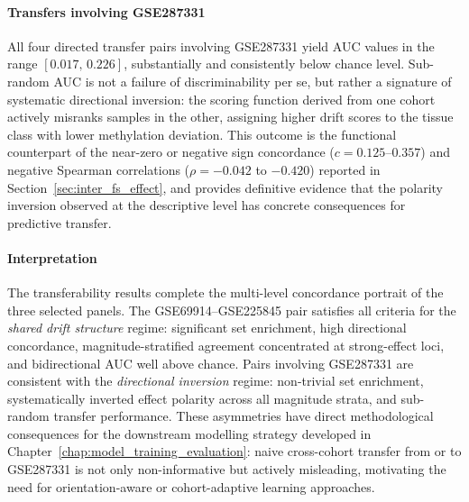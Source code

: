 \paragraph{Transfers involving GSE287331}
All four directed transfer pairs involving GSE287331 yield AUC values
in the range $[0.017,\, 0.226]$, substantially and consistently below
chance level.
Sub-random AUC is not a failure of discriminability per se, but rather
a signature of systematic directional inversion: the scoring function
derived from one cohort actively misranks samples in the other,
assigning higher drift scores to the tissue class with lower methylation
deviation.
This outcome is the functional counterpart of the near-zero or negative
sign concordance ($c = 0.125$--$0.357$) and negative Spearman correlations
($\rho = -0.042$ to $-0.420$) reported in Section~\ref{sec:inter_fs_effect},
and provides definitive evidence that the polarity inversion observed at
the descriptive level has concrete consequences for predictive transfer.

\paragraph{Interpretation}
The transferability results complete the multi-level concordance portrait
of the three selected panels.
The GSE69914--GSE225845 pair satisfies all criteria for the
\emph{shared drift structure} regime: significant set enrichment,
high directional concordance, magnitude-stratified agreement concentrated
at strong-effect loci, and bidirectional AUC well above chance.
Pairs involving GSE287331 are consistent with the
\emph{directional inversion} regime: non-trivial set enrichment,
systematically inverted effect polarity across all magnitude strata,
and sub-random transfer performance.
These asymmetries have direct methodological consequences for the
downstream modelling strategy developed in Chapter~\ref{chap:model_training_evaluation}:
naive cross-cohort transfer from or to GSE287331 is not only
non-informative but actively misleading, motivating the need for
orientation-aware or cohort-adaptive learning approaches.

